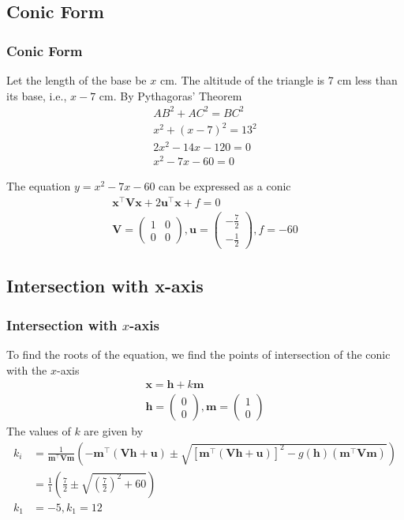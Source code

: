 \documentclass{beamer}
\let\vec\mathbf
\newcommand{\myvec}[1]{\ensuremath{\begin{pmatrix}#1\end{pmatrix}}}
\providecommand{\sbrak}[1]{\ensuremath{{}\left[#1\right]}}
\providecommand{\brak}[1]{\ensuremath{\left(#1\right)}}
\begin{document}
\subsection{Conic Form}
\begin{frame}
    \frametitle{Conic Form}
    Let the length of the base be $x$ cm. The altitude of the triangle is 7 cm less than its base, i.e.,
    $x - 7$ cm. By Pythagoras' Theorem
    \begin{align}
        AB^2 + AC^2 = BC^2 \\
        x^2 + (x - 7)^2 = 13^2 \\
        2x^2 - 14x - 120 = 0 \\
        x^2 - 7x - 60 = 0
    \end{align}
    
    The equation $y = x^2 - 7x - 60$ can be expressed as a conic 
    \begin{align}
        \vec{x}^\top\vec{V}\vec{x} + 2\vec{u}^\top\vec{x} + f = 0 \\
        \vec{V} = \myvec{1 & 0 \\ 0 & 0}, \vec{u} = \myvec{-\frac{7}{2} \\ -\frac{1}{2}}, f = -60
    \end{align}
\end{frame}

\subsection{Intersection with x-axis}
\begin{frame}
    \frametitle{Intersection with $x$-axis}
    
    To find the roots of the equation, we find the points of intersection of the 
    conic with the $x$-axis
    \begin{align}
        \vec{x} = \vec{h} + k\vec{m} \\
        \vec{h} = \myvec{0 \\ 0}, \vec{m} = \myvec{1 \\ 0}
    \end{align}
    The values of $k$ are given by
    \begin{align}
        k_i &= \frac{1}{\vec{m}^\top\vec{V}\vec{m}}\brak{-\vec{m}^\top\brak{\vec{V\vec{h} + \vec{u}}} \pm \sqrt{
            \sbrak{\vec{m}^\top\brak{\vec{V}\vec{h} + \vec{u}}}^2 - g\brak{\vec{h}}\brak{\vec{m}^\top\vec{V}\vec{m}}
        }} \\
        &= \frac{1}{1} \brak{\frac{7}{2} \pm \sqrt{\brak{\frac{7}{2}}^2 + 60}} \\
        k_1 &= -5, k_1 = 12
    \end{align}
\end{frame}
\end{document}
